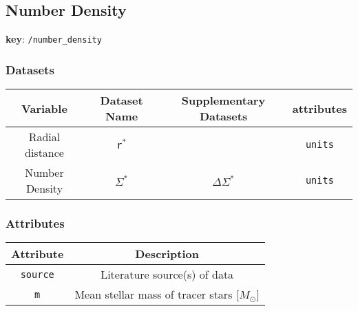 \subsection{Number Density}

\textbf{key}: \texttt{/number\_density}

\subsubsection{Datasets}

\begin{center}
\begin{tabular}{ | c | c | c | c | }
    \hline
    Variable & Dataset Name & Supplementary Datasets &  attributes \\
    \hline\hline
    Radial distance & \texttt{r\(^*\)} & & \texttt{units} \\
    \hline
    Number Density & \texttt{\(\Sigma^*\)} & \texttt{\(\Delta\Sigma^*\)} & \texttt{units} \\
    \hline

\end{tabular}
\end{center}

\subsubsection{Attributes}


\begin{center}
\begin{tabular}{ | c | c | }
    \hline
    Attribute & Description \\
    \hline\hline
    \texttt{source} & Literature source(s) of data \\
    \hline
    \texttt{m} & Mean stellar mass of tracer stars [\(M_\odot\)] \\
    \hline
\end{tabular}
\end{center}
